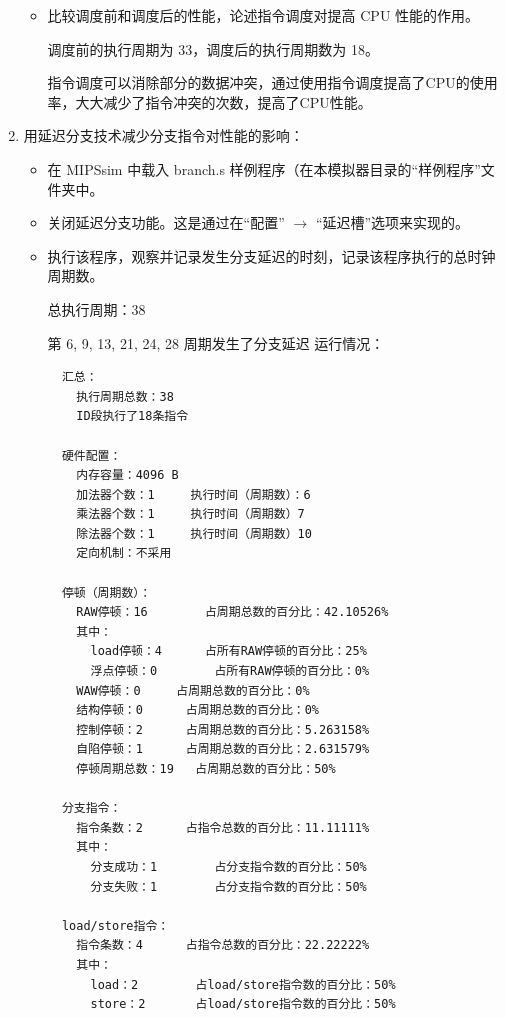\documentclass[blue,normal,cn]{elegantnote}
\begin{document}
\begin{enumerate}[wide=0pt, listparindent=2em, parsep=0pt]
\begin{itemize}[leftmargin=3em, listparindent=2em, parsep=0pt]
              \item 比较调度前和调度后的性能，论述指令调度对提高 CPU 性能的作用。

                    \textcolor{ans}{调度前的执行周期为 33，调度后的执行周期数为 18。}

                    \textcolor{ans}{指令调度可以消除部分的数据冲突，通过使用指令调度提高了CPU的使用率，大大减少了指令冲突的次数，提高了CPU性能。}


          \end{itemize}

    \item 用延迟分支技术减少分支指令对性能的影响：

          \begin{itemize}[leftmargin=3em, listparindent=2em, parsep=0pt]
              \item 在 MIPSsim 中载入 branch.s 样例程序（在本模拟器目录的“样例程序”文件夹中。
              \item 关闭延迟分支功能。这是通过在“配置” $\rightarrow$ “延迟槽”选项来实现的。
              \item 执行该程序，观察并记录发生分支延迟的时刻，记录该程序执行的总时钟周期数。

                    \textcolor{ans}{总执行周期：38}

                    \textcolor{ans}{第 6, 9, 13, 21, 24, 28 周期发生了分支延迟}
                    \textcolor{ans}{运行情况：}
                    \begin{lstlisting}
  汇总：
    执行周期总数：38
    ID段执行了18条指令

  硬件配置：
    内存容量：4096 B
    加法器个数：1		执行时间（周期数）：6
    乘法器个数：1		执行时间（周期数）7		
    除法器个数：1		执行时间（周期数）10		
    定向机制：不采用

  停顿（周期数）：
    RAW停顿：16		占周期总数的百分比：42.10526%
    其中：
      load停顿：4		占所有RAW停顿的百分比：25%
      浮点停顿：0		占所有RAW停顿的百分比：0%
    WAW停顿：0		占周期总数的百分比：0%
    结构停顿：0		占周期总数的百分比：0%
    控制停顿：2		占周期总数的百分比：5.263158%
    自陷停顿：1		占周期总数的百分比：2.631579%
    停顿周期总数：19	占周期总数的百分比：50%

  分支指令：
    指令条数：2		占指令总数的百分比：11.11111%
    其中：
      分支成功：1		占分支指令数的百分比：50%
      分支失败：1		占分支指令数的百分比：50%

  load/store指令：
    指令条数：4		占指令总数的百分比：22.22222%
    其中：
      load：2		占load/store指令数的百分比：50%
      store：2		占load/store指令数的百分比：50%


\end{lstlisting}
\end{itemize}
\end{enumerate}
\end{document}

